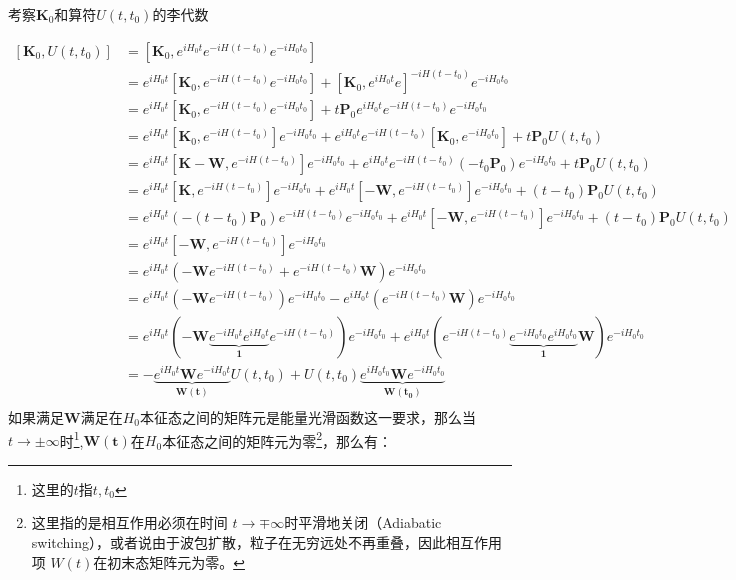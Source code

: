 考察$\boldsymbol{K}_0$和算符$U(t,t_0)$的李代数

\[
    \begin{aligned}
        [\boldsymbol{K}_0,U(t,t_0)]&=[\boldsymbol{K}_0,e^{iH_0t}e^{-iH(t-t_0)}e^{-iH_0t_0}]\\
        &=
        e^{iH_0t}[\boldsymbol{K}_0,e^{-iH(t-t_0)}e^{-iH_0t_0}]+[\boldsymbol{K}_0,e^{iH_0t}e]^{-iH(t-t_0)}e^{-iH_0t_0}\\
        &=
        e^{iH_0t}[\boldsymbol{K}_0,e^{-iH(t-t_0)}e^{-iH_0t_0}]+t\boldsymbol{P}_0e^{iH_0t}e^{-iH(t-t_0)}e^{-iH_0t_0}\\
        &=
        e^{iH_0t}[\boldsymbol{K}_0,e^{-iH(t-t_0)}]e^{-iH_0t_0}+e^{iH_0t}e^{-iH(t-t_0)}[\boldsymbol{K}_0,e^{-iH_0t_0}]+t\boldsymbol{P}_0U(t,t_0)\\
        &=
        e^{iH_0t}[\boldsymbol{K}-\boldsymbol{W},e^{-iH(t-t_0)}]e^{-iH_0t_0}+e^{iH_0t}e^{-iH(t-t_0)}(-t_0\boldsymbol{P}_0)e^{-iH_0t_0}+t\boldsymbol{P}_0U(t,t_0)\\
        &=
        e^{iH_0t}[\boldsymbol{K},e^{-iH(t-t_0)}]e^{-iH_0t_0}+e^{iH_0t}[-\boldsymbol{W},e^{-iH(t-t_0)}]e^{-iH_0t_0}+(t-t_0)\boldsymbol{P}_0U(t,t_0)\\
        &=
        e^{iH_0t}(-(t-t_0)\boldsymbol{P}_0)e^{-iH(t-t_0)}e^{-iH_0t_0}+e^{iH_0t}[-\boldsymbol{W},e^{-iH(t-t_0)}]e^{-iH_0t_0}+(t-t_0)\boldsymbol{P}_0U(t,t_0)\\
        &=
        e^{iH_0t}[-\boldsymbol{W},e^{-iH(t-t_0)}]e^{-iH_0t_0}\\
        &=
        e^{iH_0t}\left(-\boldsymbol{W}e^{-iH(t-t_0)}+e^{-iH(t-t_0)}\boldsymbol{W}\right)e^{-iH_0t_0}\\
        &=
        e^{iH_0t}\left(-\boldsymbol{W}e^{-iH(t-t_0)}\right)e^{-iH_0t_0}-e^{iH_0t}\left(e^{-iH(t-t_0)}\boldsymbol{W}\right)e^{-iH_0t_0}\\
        &=
        e^{iH_0t}\left(-\boldsymbol{W}\underbrace{e^{-iH_0t}e^{iH_0t}}_{\mathbf{1}} e^{-iH(t-t_0)}\right)e^{-iH_0t_0}+e^{iH_0t}\left(e^{-iH(t-t_0)}\underbrace{e^{-iH_0t_0}e^{iH_0t_0}}_{\mathbf{1}}\boldsymbol{W}\right)e^{-iH_0t_0}\\
        &=
        -\underbrace{e^{iH_0t}\boldsymbol{W}e^{-iH_0t}}_{\boldsymbol{W(t)}}U(t,t_0)+U(t,t_0)\underbrace{e^{iH_0t_0}\boldsymbol{W}e^{-iH_0t_0}}_{\boldsymbol{W(t_0)}}\\
    \end{aligned}
\]
\color{blue}如果满足$\boldsymbol{W}$满足在$H_0$本征态之间的矩阵元是能量光滑函数这一要求，那么当$t\rightarrow\pm\infty$时\footnote{这里的$t$指$t,t_0$},$\boldsymbol{W(t)}$在$H_0$本征态之间的矩阵元为零\footnote{这里指的是相互作用必须在时间 $t\to\mp\infty $时平滑地关闭（Adiabatic switching），或者说由于波包扩散，粒子在无穷远处不再重叠，因此相互作用项 $W(t) $在初末态矩阵元为零。}，\normalcolor 那么有：
